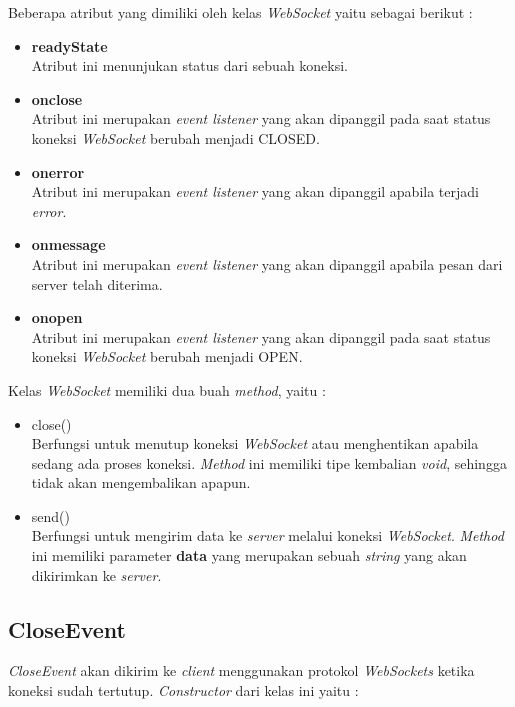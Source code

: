 Beberapa atribut yang dimiliki oleh kelas \textit{WebSocket} yaitu sebagai berikut :

\begin{itemize}
	\item \textbf{readyState} \\ Atribut ini menunjukan status dari sebuah koneksi.
	\item \textbf{onclose} \\ Atribut ini merupakan \textit{event listener} yang akan dipanggil pada saat status koneksi \textit{WebSocket} berubah menjadi CLOSED.
	\item \textbf{onerror} \\ Atribut ini merupakan \textit{event listener} yang akan dipanggil apabila terjadi \textit{error}.
	\item \textbf{onmessage} \\ Atribut ini merupakan \textit{event listener} yang akan dipanggil apabila pesan dari server telah diterima.
	\item \textbf{onopen} \\ Atribut ini merupakan \textit{event listener} yang akan dipanggil pada saat status koneksi \textit{WebSocket} berubah menjadi OPEN.
\end{itemize}

Kelas \textit{WebSocket} memiliki dua buah \textit{method}, yaitu : 

\begin{itemize}
	\item close() \\ Berfungsi untuk menutup koneksi \textit{WebSocket} atau menghentikan apabila sedang ada proses koneksi. \textit{Method} ini memiliki tipe kembalian \textit{void}, sehingga tidak akan mengembalikan apapun.
	\item send() \\ Berfungsi untuk mengirim data ke \textit{server} melalui koneksi \textit{WebSocket}. \textit{Method} ini memiliki parameter \textbf{data} yang merupakan sebuah \textit{string} yang akan dikirimkan ke \textit{server}.
\end{itemize}

\subsection{CloseEvent}
\textit{CloseEvent} akan dikirim ke \textit{client} menggunakan protokol \textit{WebSockets} ketika koneksi sudah tertutup. \textit{Constructor} dari kelas ini yaitu : \\

